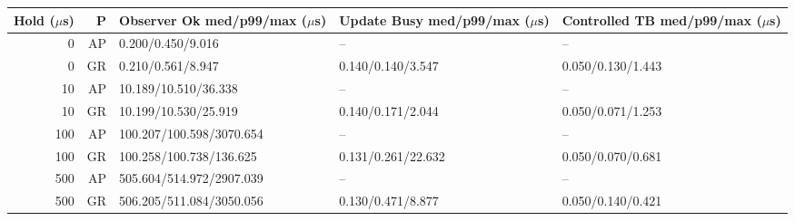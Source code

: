 \begin{tabular}{@{}rrlll@{}}
\toprule
\shortstack{Hold\\($\mu$s)} & P & \shortstack{Observer Ok\\med/p99/max ($\mu$s)} & \shortstack{Update Busy\\med/p99/max ($\mu$s)} & \shortstack{Controlled TB\\med/p99/max ($\mu$s)} \\
\midrule
0 & AP & 0.200/0.450/9.016 & -- & -- \\
0 & GR & 0.210/0.561/8.947 & 0.140/0.140/3.547 & 0.050/0.130/1.443 \\
10 & AP & 10.189/10.510/36.338 & -- & -- \\
10 & GR & 10.199/10.530/25.919 & 0.140/0.171/2.044 & 0.050/0.071/1.253 \\
100 & AP & 100.207/100.598/3070.654 & -- & -- \\
100 & GR & 100.258/100.738/136.625 & 0.131/0.261/22.632 & 0.050/0.070/0.681 \\
500 & AP & 505.604/514.972/2907.039 & -- & -- \\
500 & GR & 506.205/511.084/3050.056 & 0.130/0.471/8.877 & 0.050/0.140/0.421 \\
\bottomrule
\end{tabular}
